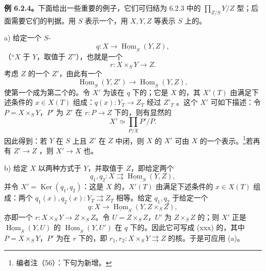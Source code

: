 \textbf{例 6.2.4。}下面给出一些重要的例子，它们可归结为 6.2.3 中的 $\prod_{Z/S}Y/Z$ 型；后面需要它们的判据。用 $S$ 表示一个，用 $X,Y,Z$ 等表示 $S$ 上的。

a) 给定一个 $S$-
\[
q:X\longrightarrow\underline{\operatorname{Hom}}_S(Y,Z),\tag{x}
\]
（“$X$ 于 $Y$，取值于 $Z$”），也就是一个
\[
r:X\times_S Y\longrightarrow Z.\tag{xx}
\]
考虑 $Z$ 的一个 $Z'$，由此有一个
\[
\underline{\operatorname{Hom}}_S(Y,Z')\longrightarrow\underline{\operatorname{Hom}}_S(Y,Z),
\]
使第一个成为第二个的。令 $X'$ 为该在 $q$ 下的；它是 $X$ 的，其 $X'(T)$ 由满足下述条件的 $x\in X(T)$ 组成：$q(x):Y_T\to Z_T$ 经过 $Z'_T$ 。这个 $X'$ 可如下描述：令 $P=X\times_S Y$，$P'$ 为 $Z'$ 在 $r:P\to Z$ 下的，则有显然的
\[
X'\simeq\prod_{P/X}P'/P.\tag{xxx}
\]
因此得到：若 $Y$ 在 $S$ 上且 $Z'$ 在 $Z$ 中闭，则 $X$ 的 $X'$ 可由 $X$ 的一个表示。\footnote{编者注（56）：下句为新增。}若再有 $Z'\to Z$ ，则 $X'\to X$ 也。

b) 给定 $X$ 以两种方式于 $Y$，并取值于 $Z$，即给定两个
\[
q_1,q_2:X\rightrightarrows\underline{\operatorname{Hom}}_S(Y,Z),
\]
并令 $X'=\operatorname{Ker}(q_1,q_2)$：这是 $X$ 的，$X'(T)$ 由满足下述条件的 $x\in X(T)$ 组成：两个 $q_1(x),q_2(x):Y_T\rightrightarrows Z_T$ 相等。给定 $q_1,q_2$ 于给定一个
\[
q:X\longrightarrow\underline{\operatorname{Hom}}_S(Y,Z\times_S Z),
\]
亦即一个 $r:X\times_S Y\to Z\times_S Z$。令 $U=Z\times_S Z$，$U'$ 为 $Z\times_S Z$ 的；则 $X'$ 正是 $\underline{\operatorname{Hom}}_S(Y,U)$ 的 $\underline{\operatorname{Hom}}_S(Y,U')$ 在 $q$ 下的。因此它可写成 (xxx) 的，其中 $P=X\times_S Y$，$P'$ 为在 $r$ 下的，即 $r_1,r_2:X\times_S Y\rightrightarrows Z$ 的核。于是可应用 (a)。

